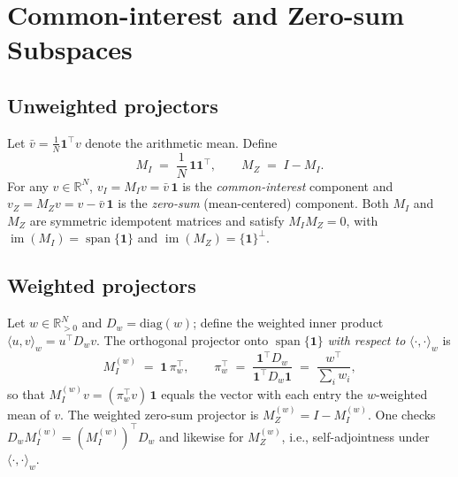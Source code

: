 \documentclass[11pt]{article}
\newcommand{\one}{\mathbf{1}}
\newcommand{\R}{\mathbb{R}}
\begin{document}
\section{Common-interest and Zero-sum Subspaces}
\subsection{Unweighted projectors}
Let $\bar v = \tfrac{1}{N}\one^\top v$ denote the arithmetic mean. Define
\begin{equation}
\label{eq:unweighted-projectors}
M_I \;=\; \frac{1}{N}\,\one\one^\top,\qquad
M_Z \;=\; I - M_I.
\end{equation}
For any $v\in\R^N$, $v_I=M_Iv=\bar v\,\one$ is the \emph{common-interest} component and $v_Z=M_Zv=v-\bar v\,\one$ is the \emph{zero-sum} (mean-centered) component. Both $M_I$ and $M_Z$ are symmetric idempotent matrices and satisfy $M_I M_Z=0$, with $\operatorname{im}(M_I)=\operatorname{span}\{\one\}$ and $\operatorname{im}(M_Z)=\{\one\}^\perp$.

\subsection{Weighted projectors}
Let $w\in\R^N_{>0}$ and $D_w=\mathrm{diag}(w)$; define the weighted inner product $\langle u,v\rangle_w = u^\top D_w v$. The orthogonal projector onto $\operatorname{span}\{\one\}$ \emph{with respect to} $\langle\cdot,\cdot\rangle_w$ is
\begin{equation}
\label{eq:weighted-projectors}
M_I^{(w)} \;=\; \one\,\pi_w^\top,\qquad
\pi_w^\top \;=\; \frac{\one^\top D_w}{\one^\top D_w \one} \;=\; \frac{w^\top}{\sum_i w_i},
\end{equation}
so that $M_I^{(w)} v = (\pi_w^\top v)\,\one$ equals the vector with each entry the $w$-weighted mean of $v$. The weighted zero-sum projector is $M_Z^{(w)} = I - M_I^{(w)}$. One checks $D_w M_I^{(w)}=(M_I^{(w)})^\top D_w$ and likewise for $M_Z^{(w)}$, i.e., self-adjointness under $\langle\cdot,\cdot\rangle_w$.
\end{document}
